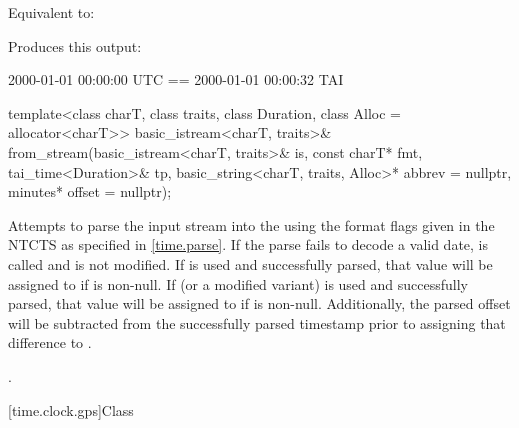 \begin{itemdescr}
\pnum
\effects
Equivalent to:

\pnum
\begin{example}

Produces this output:
\begin{outputblock}
2000-01-01 00:00:00 UTC == 2000-01-01 00:00:32 TAI
\end{outputblock}
\end{example}
\end{itemdescr}

%
\begin{itemdecl}
template<class charT, class traits, class Duration, class Alloc = allocator<charT>>
  basic_istream<charT, traits>&
    from_stream(basic_istream<charT, traits>& is, const charT* fmt,
                tai_time<Duration>& tp, basic_string<charT, traits, Alloc>* abbrev = nullptr,
                minutes* offset = nullptr);
\end{itemdecl}

\begin{itemdescr}
\pnum
\effects
Attempts to parse the input stream 
into the   using
the format flags given in the NTCTS 
as specified in \ref{time.parse}.
If the parse fails to decode a valid date,
 is called and
 is not modified.
If  is used and successfully parsed,
that value will be assigned to  if  is non-null.
If  (or a modified variant) is used and successfully parsed,
that value will be assigned to  if  is non-null.
Additionally, the parsed offset will be subtracted from
the successfully parsed timestamp prior to assigning that difference to .

\pnum
\returns
{}.
\end{itemdescr}

[time.clock.gps]{Class }


